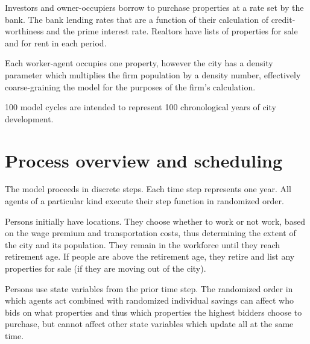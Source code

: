 Investors and owner-occupiers borrow to purchase properties at a rate set by the bank. The bank lending rates that are a function of their calculation of credit-worthiness and the prime interest rate. Realtors have lists of properties for sale and for rent in each period. 

Each worker-agent occupies one property, however the city has a density parameter which multiplies the firm population by a density number, effectively coarse-graining the model for the purposes of the firm's calculation. 

100 model cycles are intended to represent 100 chronological years of city development.




\section{Process overview and scheduling}

The model proceeds in discrete steps. Each time step represents one year.  All agents of a particular kind execute their step function in randomized order. 

Persons initially have locations. They choose whether to work or not work, based on the wage premium and transportation costs, thus determining the extent of the city and its population. They remain in the workforce until they reach retirement age. If people are above the retirement age, they retire and list any properties for sale (if they are moving out of the city). 


Persons use state variables from the prior time step. The randomized order in which agents act combined with randomized individual savings can affect who bids on what properties and thus which properties the highest bidders choose to purchase, but cannot affect other state variables which update all at the same time. %


